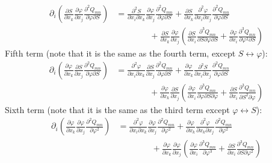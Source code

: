 \documentclass[reqno]{article}
\begin{document}
	\begin{equation}
	\begin{split}
		\partial_i\left( \frac{\partial S}{\partial x_k}\frac{\partial \varphi}{\partial x_j} \frac{\partial^2 Q_{mn}}{\partial \varphi \partial S} \right) &= \frac{\partial^2 S}{\partial x_i \partial x_k} \frac{\partial \varphi}{\partial x_j} \frac{\partial^2 Q_{mn}}{\partial \varphi \partial S} + \frac{\partial S}{\partial x_k} \frac{\partial^2 \varphi}{\partial x_i \partial x_j} \frac{\partial^2 Q_{mn}}{\partial \varphi \partial S} \\
		&\qquad\qquad + \frac{\partial S}{\partial x_k}\frac{\partial \varphi}{\partial x_j} \left( \frac{\partial S}{\partial x_i}\frac{\partial^3 Q_{mn}}{\partial S \partial \varphi \partial S} + \frac{\partial \varphi}{\partial x_i}\frac{\partial^3 Q_{mn}}{\partial \varphi^2 \partial S} \right)
	\end{split}
	\end{equation}
	Fifth term (note that it is the same as the fourth term, except $S \leftrightarrow \varphi$):
	\begin{equation}
	\begin{split}
		\partial_i\left( \frac{\partial \varphi}{\partial x_k}\frac{\partial S}{\partial x_j} \frac{\partial^2 Q_{mn}}{\partial \varphi \partial S} \right) &= \frac{\partial^2 \varphi}{\partial x_i \partial x_k} \frac{\partial S}{\partial x_j} \frac{\partial^2 Q_{mn}}{\partial \varphi \partial S} + \frac{\partial \varphi}{\partial x_k} \frac{\partial^2 S}{\partial x_i \partial x_j} \frac{\partial^2 Q_{mn}}{\partial \varphi \partial S} \\
		&\qquad\qquad + \frac{\partial \varphi}{\partial x_k}\frac{\partial S}{\partial x_j} \left( \frac{\partial \varphi}{\partial x_i}\frac{\partial^3 Q_{mn}}{\partial \varphi \partial S \partial \varphi} + \frac{\partial S}{\partial x_i}\frac{\partial^3 Q_{mn}}{\partial S^2 \partial \varphi} \right)
	\end{split}
	\end{equation}
	Sixth term (note that it is the same as the third term except $\varphi \leftrightarrow S$):
	\begin{equation} \label{eq:expand-end}
	\begin{split}
		\partial_i \left( \frac{\partial \varphi}{\partial x_k} \frac{\partial \varphi}{\partial x_j}\frac{\partial^2 Q_{mn}}{\partial \varphi^2} \right) &= \frac{\partial^2 \varphi}{\partial x_i \partial x_k} \frac{\partial \varphi}{\partial x_j}\frac{\partial^2 Q_{mn}}{\partial \varphi^2} + \frac{\partial \varphi}{\partial x_k} \frac{\partial^2 \varphi}{\partial x_k \partial x_j} \frac{\partial^2 Q_{mn}}{\partial \varphi^2}\\
		&\qquad\qquad + \frac{\partial \varphi}{\partial x_k}\frac{\partial \varphi}{\partial x_j} \left( \frac{\partial \varphi}{\partial x_i} \frac{\partial^3 Q_{mn}}{\partial \varphi^3} + \frac{\partial S}{\partial x_i} \frac{\partial^3 Q_{mn}}{\partial S \partial \varphi^2} \right)
	\end{split}
	\end{equation}
\end{document}
